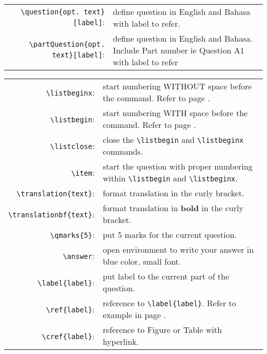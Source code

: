\documentclass[11pt]{article}
\begin{document}
\begin{table}[H]
	\begin{tabularx}{\linewidth}{r X}		
		\verb|\question{opt. text}[label]|: & define question in English and Bahasa with label to refer.\\
		
		\verb|\partQuestion{opt. text}[label]|: & define question in English and Bahasa. Include Part number ie Question A1 with label to refer\\			 
	\end{tabularx}
\end{table}

\begin{table}[H]
	\begin{tabularx}{\linewidth}{r X}		
		\verb|\listbeginx|: & start numbering WITHOUT space before the command. Refer to page \pageref{chemical}.\\
		
		\verb|\listbegin|: & start numbering WITH space before the command. Refer to page \pageref{itm:net}. \\
		
		\verb|\listclose|: & close the \verb|\listbegin| and \verb|\listbeginx| commands.\\
		
		\verb|\item|: & start the question with proper numbering within \verb|\listbegin| and \verb|\listbeginx|.\\ 
		
		\verb|\translation{text}|: & format translation in the curly bracket.\\
		
		\verb|\translationbf{text}|: & format translation in \textbf{bold} in the curly bracket.\\
		
		\verb|\qmarks{5}|: & put 5 marks for the current question.\\
		
		\verb|\answer|: & open environment to write your answer in blue color, small font.\\
		
		\verb|\label{label}|: & put label to the current part of the question. \\
		
		\verb|\ref{label}|: & reference to \verb|\label{label}|. Refer to example in page \pageref{chemical}.\\
		
		\verb|\cref{label}|: & reference to Figure or Table  with hyperlink.\\
		

\end{tabularx}
\end{table}
\end{document}
